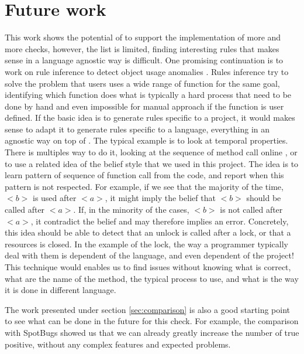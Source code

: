 \section{Future work}
\label{sec:future_work}

This work shows the potential of \slang{} to support the implementation of more and more checks, however, the list is limited, finding interesting rules that makes sense in a language agnostic way is difficult. 
One promising continuation is to work on rule inference to detect object usage anomalies \cite{Wasylkowski:2007:DOU:1287624.1287632}. \newline
Rules inference try to solve the problem that users uses a wide range of function for the same goal,  identifying which function does what is typically a hard process that need to be done by hand and even impossible for manual approach if the function is user defined. 
If the basic idea is to generate rules specific to a project, it would makes sense to adapt it to generate rules specific to a language, everything in an agnostic way on top of \slang{}. 
The typical example is to look at temporal properties. 
There is multiples way to do it, looking at the sequence of method call online \cite{Gabel:2010:OIE:1806799.1806806}, or to use a related idea of the belief style \cite{Engler:2001:BDB:502059.502041} that we used in this project. 
The idea is to learn pattern of sequence of function call from the code, and report when this pattern is not respected. 
For example, if we see that the majority of the time, \emph{$<b>$} is used after \emph{$<a>$}, it might imply the belief that \emph{$<b>$} should be called after \emph{$<a>$}. If, in the minority of the cases, \emph{$<b>$} is not called after \emph{$<a>$}, it contradict the belief and may therefore implies an error. 
Concretely, this idea should be able to detect that an unlock is called after a lock, or that a resources is closed. 
In the example of the lock, the way a programmer typically deal with them is dependent of the language, and even dependent of the project! \newline
This technique would enables us to find issues without knowing what is correct, what are the name of the method, the typical process to use, and what is the way it is done in different language.

The work presented under section \ref{sec:comparison} is also a good starting point to see what can be done in the future for this check. 
For example, the comparison with SpotBugs showed us that we can already greatly increase the number of true positive, without any complex features and expected problems.